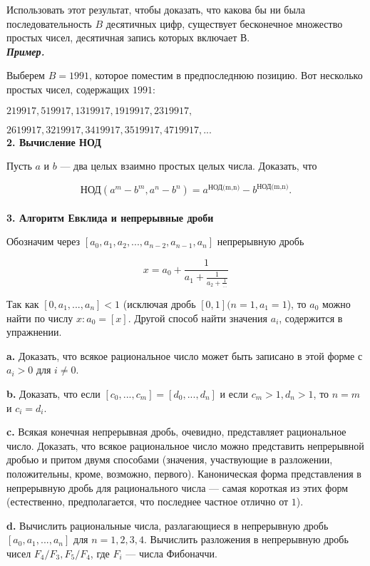 \documentclass{mai_book}
\begin{document}
Использовать этот результат, чтобы доказать, что какова бы ни была последовательность $B$ десятичных цифр, существует бесконечное множество простых чисел, десятичная запись которых включает $В$.
\\

\noindent \textbf{\textit{Пример.}}

Выберем $B = 1991$, которое поместим в предпоследнюю позицию.
Вот несколько простых чисел, содержащих $1991$:

$219917, 519917, 1319917, 1919917, 2319917,$

$2619917, 3219917, 3419917, 3519917, 4719917, ...$
\\

\noindent \textbf{2. Вычисление НОД}

Пусть $a$ и $b$ — два целых взаимно простых целых числа. Доказать,
что

\[
\text{НОД}(a^m-b^m,a^n-b^n)=a^{\text{НОД(m,n)}}-b^{\text{НОД(m,n)}}.
\]
\\

\noindent \textbf{3. Алгоритм Евклида и непрерывные дроби}

Обозначим через $[a_0,a_1,a_2,...,a_{n-2},a_{n-1},a_{n}]$ непрерывную дробь

\[
x = a_0+\frac{1}{a_1+\frac{1}{a_2+\frac{1}{...}}}
\]

\noindent Так как $[0,a_1,...,a_n] < 1$ (исключая дробь $[0,1] (n=1,a_1=1$), то $a_0$
можно найти по числу $x: a_0=[x]$. Другой способ найти значения $a_i$,
содержится в упражнении.

\textbf{a.} Доказать, что всякое рациональное число может быть записано
в этой форме с $a_i>0$ для $i \ne 0$.

\textbf{b.} Доказать, что если $[c_0,...,c_m]=[d_0,...,d_n]$ и если $c_m>1,d_n>1$, то $n=m$ и $c_i=d_i$.

\textbf{c.} Всякая конечная непрерывная дробь, очевидно, представляет 
рациональное число. Доказать, что всякое рациональное число можно
представить непрерывной дробью и притом двумя способами 
(значения, участвующие в разложении, положительны, кроме, возможно, 
первого). Каноническая форма представления в непрерывную дробь для
рационального числа — самая короткая из этих форм (естественно,
предполагается, что последнее частное отлично от $1$).

\textbf{d.} Вычислить рациональные числа, разлагающиеся в непрерывную
дробь $[a_0,a_1,...,a_n]$ для $n=1,2,3,4$. Вычислить разложения в 
непрерывную дробь чисел $F_4/F_3,F_5/F_4$, где $F_i$ — числа Фибоначчи.
\\
\end{document}
